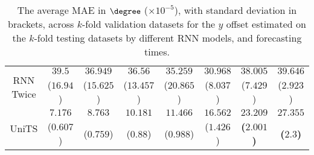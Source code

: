 \begin{table}[!ht]
{\begin{tabular}{|c|c|c|c|c|c|c|c|}
			\multirow{2}{*}{RNN Twice} & $39.5$ & $36.949$ & $36.56$ & $35.259$ & $30.968$ & $38.005$ & $39.646$ \\
			 & ($16.94$) & ($15.625$) & ($13.457$) & ($20.865$) & ($8.037$) & ($7.429$) & ($2.923$) \\ \hline
			\multirow{2}{*}{UniTS} & $7.176$ & $8.763$ & $10.181$ & $11.466$ & $16.562$ & $\mathbf{23.209}$ & $\mathbf{27.355}$ \\
			 & ($0.607$) & ($0.759$) & ($0.88$) & ($0.988$) & ($1.426$) & \textbf{(}$\mathbf{2.001}$\textbf{)} & \textbf{(}$\mathbf{2.3}$\textbf{)} \\ \hline
		\end{tabular}
	}
	\caption{The average MAE in $\degree$ ($\times 10^{-5}$), with standard deviation in brackets, across $k$-fold validation datasets for the $y$ offset estimated on the $k$-fold testing datasets by different RNN models, and forecasting times.}
	\label{tab:all_latitude_no_abs_MAE}
\end{table}